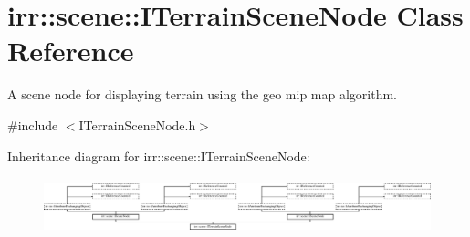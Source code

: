 \hypertarget{classirr_1_1scene_1_1ITerrainSceneNode}{}\section{irr\+:\+:scene\+:\+:I\+Terrain\+Scene\+Node Class Reference}
\label{classirr_1_1scene_1_1ITerrainSceneNode}


A scene node for displaying terrain using the geo mip map algorithm.  




{\ttfamily \#include $<$I\+Terrain\+Scene\+Node.\+h$>$}

Inheritance diagram for irr\+:\+:scene\+:\+:I\+Terrain\+Scene\+Node\+:\begin{figure}[H]
\begin{center}
\leavevmode
\includegraphics[height=1.682692cm]{classirr_1_1scene_1_1ITerrainSceneNode}
\end{center}
\end{figure}
